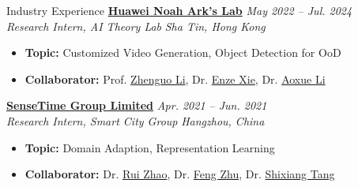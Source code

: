 \documentclass[a4paper]{resume} %
\begin{document}
\begin{rSection}{Industry Experience}
{\bf \href{http://dev3.noahlab.com.hk}{Huawei Noah Ark's Lab}} \hfill{\it May 2022 -- Jul. 2024}\\
{\it Research Intern, AI Theory Lab} \hfill{\it Sha Tin, Hong Kong}
\begin{itemize}
    \item {\bf Topic:} Customized Video Generation, Object Detection for OoD
 	\item {\bf Collaborator:} Prof. \href{https://zhenguol.github.io}{Zhenguo Li}, Dr. \href{https://xieenze.github.io}{Enze Xie}, Dr. \href{https://openreview.net/profile?id=~Aoxue\_Li2}{Aoxue Li}
\end{itemize}


 {\bf \href{https://www.sensetime.com/en}{SenseTime Group Limited}} \hfill{\it Apr. 2021 -- Jun. 2021}\\
 {\it Research Intern, Smart City Group} \hfill{\it Hangzhou, China}
 \begin{itemize}
     \item {\bf Topic:} Domain Adaption, Representation Learning
  	\item {\bf Collaborator:} Dr. \href{http://zhaorui.xyz/}{Rui Zhao}, Dr. \href{https://zhufengx.github.io/}{Feng Zhu}, Dr. \href{https://scholar.google.com.tw/citations?user=TJ4ihdkAAAAJ}{Shixiang Tang}
 \end{itemize}



\end{rSection}
\end{document}
